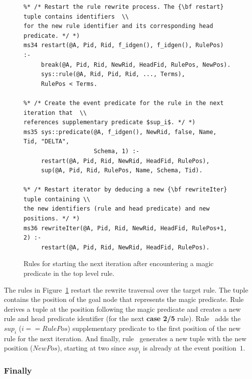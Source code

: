 \begin{figure}[!t]
\ssp
\centering
\begin{lstlisting}
%* /* Restart the rule rewrite process. The {\bf restart} tuple contains identifiers  \\
for the new rule identifier and its corresponding head predicate. */ *)
ms34 restart(@A, Pid, Rid, f_idgen(), f_idgen(), RulePos) :-
     break(@A, Pid, Rid, NewRid, HeadFid, RulePos, NewPos).
     sys::rule(@A, Rid, Pid, Rid, ..., Terms),
     RulePos < Terms.
	
%* /* Create the event predicate for the rule in the next iteration that  \\
references supplementary predicate $sup_i$. */ *)
ms35 sys::predicate(@A, f_idgen(), NewRid, false, Name, Tid, "DELTA", 
                    Schema, 1) :-
     restart(@A, Pid, Rid, NewRid, HeadFid, RulePos),
     sup(@A, Pid, Rid, RulePos, Name, Schema, Tid).
	
%* /* Restart iterator by deducing a new {\bf rewriteIter} tuple containing \\
the new identifiers (rule and head predicate) and new positions. */ *)
ms36 rewriteIter(@A, Pid, Rid, NewRid, HeadFid, RulePos+1, 2) :-
     restart(@A, Pid, Rid, NewRid, HeadFid, RulePos).
\end{lstlisting}
\caption{\label{ch:magic:fig:rewrite8}Rules for starting the next iteration after
encountering a magic predicate in the top level rule. }
\end{figure}

The rules in Figure~\ref{ch:magic:fig:rewrite8} restart the rewrite traversal
over the target rule.  The  tuple contains the position of the goal
node that represents the magic predicate.  Rule~ derives a
 tuple at the position following the magic predicate and creates a
new rule and head predicate identifier (for the next {\bf case 2/5} rule).
Rule~ adds the $sup_i$ ($i==RulePos$) supplementary predicate to
the first position of the new rule for the next iteration.  And finally,
rule~ generates a new  tuple with the new position
($NewPos$), starting at two since $sup_{i}$ is already at the event 
position~$1$.

\subsubsection{Finally}

